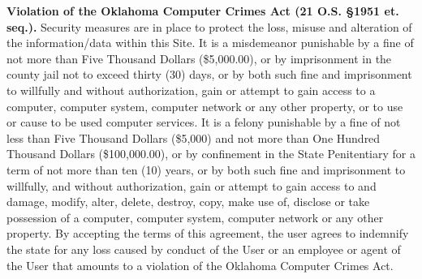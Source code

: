 \textbf{Violation of the Oklahoma Computer Crimes Act (21 O.S. \S1951 et. seq.).}
Security measures are in place to protect the loss, misuse and alteration of the
information/data within this Site. It is a misdemeanor punishable by a fine of
not more than Five Thousand Dollars (\$5,000.00), or by imprisonment in the
county jail not to exceed thirty (30) days, or by both such fine and
imprisonment to willfully and without authorization, gain or attempt to gain
access to a computer, computer system, computer network or any other property,
or to use or cause to be used computer services. It is a felony punishable by a
fine of not less than Five Thousand Dollars (\$5,000) and not more than One
Hundred Thousand Dollars (\$100,000.00), or by confinement in the State
Penitentiary for a term of not more than ten (10) years, or by both such fine
and imprisonment to willfully, and without authorization, gain or attempt to
gain access to and damage, modify, alter, delete, destroy, copy, make use of,
disclose or take possession of a computer, computer system, computer network or
any other property. By accepting the terms of this agreement, the user agrees to
indemnify the state for any loss caused by conduct of the User or an employee or
agent of the User that amounts to a violation of the Oklahoma Computer Crimes
Act.